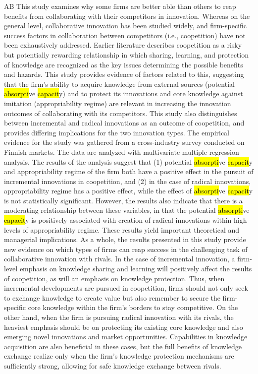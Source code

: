 \documentclass[a4paper]{article}
\begin{document}
AB \tabto{0cm}This study examines why some firms are better able than others to reap benefits from collaborating with their competitors in innovation. Whereas on the general level, collaborative innovation has been studied widely, and firm-specific success factors in collaboration between competitors (i.e., coopetition) have not been exhaustively addressed. Earlier literature describes coopetition as a risky but potentially rewarding relationship in which sharing, learning, and protection of knowledge are recognized as the key issues determining the possible benefits and hazards. This study provides evidence of factors related to this, suggesting that the firm's ability to acquire knowledge from external sources (potential \hl{absorpti}ve \hl{capacit}y) and to protect its innovations and core knowledge against imitation (appropriability regime) are relevant in increasing the innovation outcomes of collaborating with its competitors. This study also distinguishes between incremental and radical innovations as an outcome of coopetition, and provides differing implications for the two innovation types. The empirical evidence for the study was gathered from a cross-industry survey conducted on Finnish markets. The data are analyzed with multivariate multiple regression analysis. The results of the analysis suggest that (1) potential \hl{absorpti}ve \hl{capacit}y and appropriability regime of the firm both have a positive effect in the pursuit of incremental innovations in coopetition, and (2) in the case of radical innovations, appropriability regime has a positive effect, while the effect of \hl{absorpti}ve \hl{capacit}y is not statistically significant. However, the results also indicate that there is a moderating relationship between these variables, in that the potential \hl{absorpti}ve \hl{capacit}y is positively associated with creation of radical innovations within high levels of appropriability regime. These results yield important theoretical and managerial implications. As a whole, the results presented in this study provide new evidence on which types of firms can reap success in the challenging task of collaborative innovation with rivals. In the case of incremental innovation, a firm-level emphasis on knowledge sharing and learning will positively affect the results of coopetition, as will an emphasis on knowledge protection. Thus, when incremental developments are pursued in coopetition, firms should not only seek to exchange knowledge to create value but also remember to secure the firm-specific core knowledge within the firm's borders to stay competitive. On the other hand, when the firm is pursuing radical innovation with its rivals, the heaviest emphasis should be on protecting its existing core knowledge and also emerging novel innovations and market opportunities. Capabilities in knowledge acquisition are also beneficial in these cases, but the full benefits of knowledge exchange realize only when the firm's knowledge protection mechanisms are sufficiently strong, allowing for safe knowledge exchange between rivals.\par
\clearpage
\end{document}
